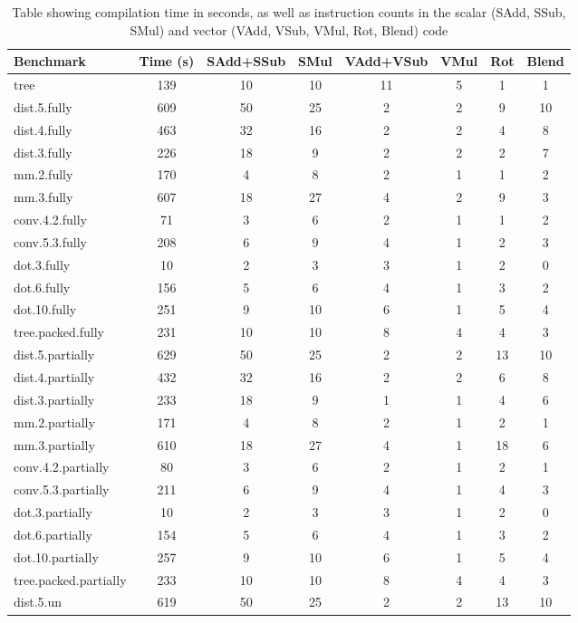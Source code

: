 \begin{table}
    \small
    \caption{Table showing compilation time in seconds, as well as instruction counts in the scalar (SAdd, SSub, SMul) and vector (VAdd, VSub, VMul, Rot, Blend) code}\label{tab:big-ass}
    \begin{tabular}{lccccccc}
    \toprule
    Benchmark & Time (s) & SAdd+SSub & SMul & VAdd+VSub & VMul & Rot & Blend\\\midrule
    tree & 139 & 10 & 10 & 11 & 5 & 1 & 1\\
    dist.5.fully & 609 & 50 & 25 & 2 & 2 & 9 & 10\\
    dist.4.fully & 463 & 32 & 16 & 2 & 2 & 4 & 8\\
    dist.3.fully & 226 & 18 & 9 & 2 & 2 & 2 & 7\\
    mm.2.fully & 170 & 4 & 8 & 2 & 1 & 1 & 2\\
    mm.3.fully & 607 & 18 & 27 & 4 & 2 & 9 & 3\\
    conv.4.2.fully & 71 & 3 & 6 & 2 & 1 & 1 & 2\\
    conv.5.3.fully & 208 & 6 & 9 & 4 & 1 & 2 & 3\\
    dot.3.fully & 10 & 2 & 3 & 3 & 1 & 2 & 0\\
    dot.6.fully & 156 & 5 & 6 & 4 & 1 & 3 & 2\\
    dot.10.fully & 251 & 9 & 10 & 6 & 1 & 5 & 4\\
    tree.packed.fully & 231 & 10 & 10 & 8 & 4 & 4 & 3\\
    dist.5.partially & 629 & 50 & 25 & 2 & 2 & 13 & 10\\
    dist.4.partially & 432 & 32 & 16 & 2 & 2 & 6 & 8\\
    dist.3.partially & 233 & 18 & 9 & 1 & 1 & 4 & 6\\
    mm.2.partially & 171 & 4 & 8 & 2 & 1 & 2 & 1\\
    mm.3.partially & 610 & 18 & 27 & 4 & 1 & 18 & 6\\
    conv.4.2.partially & 80 & 3 & 6 & 2 & 1 & 2 & 1\\
    conv.5.3.partially & 211 & 6 & 9 & 4 & 1 & 4 & 3\\
    dot.3.partially & 10 & 2 & 3 & 3 & 1 & 2 & 0\\
    dot.6.partially & 154 & 5 & 6 & 4 & 1 & 3 & 2\\
    dot.10.partially & 257 & 9 & 10 & 6 & 1 & 5 & 4\\
    tree.packed.partially & 233 & 10 & 10 & 8 & 4 & 4 & 3\\
    dist.5.un & 619 & 50 & 25 & 2 & 2 & 13 & 10\\

\end{tabular}
\end{table}
